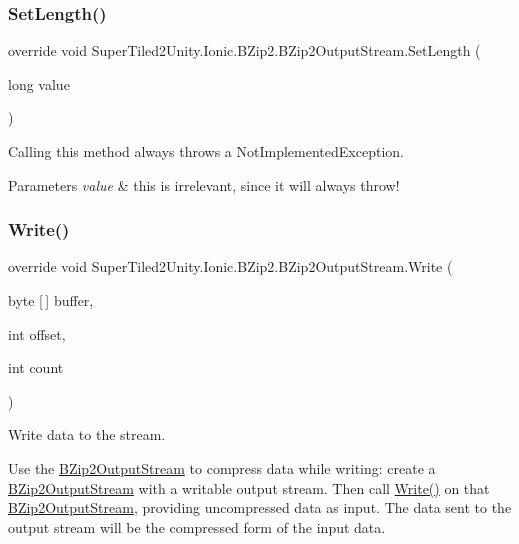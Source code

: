 \subsubsection{\texorpdfstring{Set\+Length()}{SetLength()}}
{\footnotesize\ttfamily override void Super\+Tiled2\+Unity.\+Ionic.\+B\+Zip2.\+B\+Zip2\+Output\+Stream.\+Set\+Length (\begin{DoxyParamCaption}\item[{long}]{value }\end{DoxyParamCaption})}



Calling this method always throws a Not\+Implemented\+Exception. 


\begin{DoxyParams}{Parameters}
{\em value} & this is irrelevant, since it will always throw!\\
\hline
\end{DoxyParams}
\mbox{\label{class_super_tiled2_unity_1_1_ionic_1_1_b_zip2_1_1_b_zip2_output_stream_abc8d5682aa41b2c02dcf2b2b53187278}} 
\subsubsection{\texorpdfstring{Write()}{Write()}}
{\footnotesize\ttfamily override void Super\+Tiled2\+Unity.\+Ionic.\+B\+Zip2.\+B\+Zip2\+Output\+Stream.\+Write (\begin{DoxyParamCaption}\item[{byte \mbox{[}$\,$\mbox{]}}]{buffer,  }\item[{int}]{offset,  }\item[{int}]{count }\end{DoxyParamCaption})}



Write data to the stream. 

Use the {\ttfamily \mbox{\hyperlink{class_super_tiled2_unity_1_1_ionic_1_1_b_zip2_1_1_b_zip2_output_stream}{B\+Zip2\+Output\+Stream}}} to compress data while writing\+: create a {\ttfamily \mbox{\hyperlink{class_super_tiled2_unity_1_1_ionic_1_1_b_zip2_1_1_b_zip2_output_stream}{B\+Zip2\+Output\+Stream}}} with a writable output stream. Then call {\ttfamily \mbox{\hyperlink{class_super_tiled2_unity_1_1_ionic_1_1_b_zip2_1_1_b_zip2_output_stream_abc8d5682aa41b2c02dcf2b2b53187278}{Write()}}} on that {\ttfamily \mbox{\hyperlink{class_super_tiled2_unity_1_1_ionic_1_1_b_zip2_1_1_b_zip2_output_stream}{B\+Zip2\+Output\+Stream}}}, providing uncompressed data as input. The data sent to the output stream will be the compressed form of the input data. 

